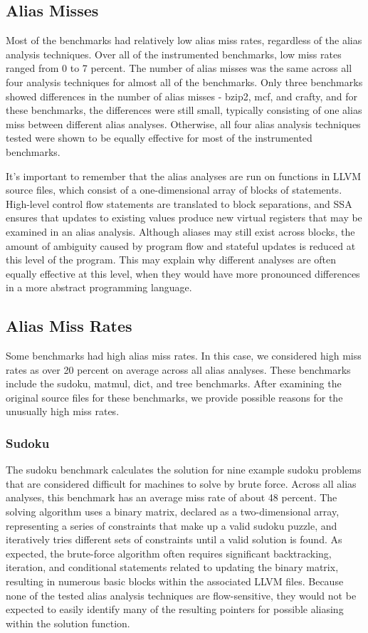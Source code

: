 \subsection{Alias Misses}
Most of the benchmarks had relatively low alias miss rates, regardless of the alias analysis techniques. Over all of the instrumented benchmarks, low miss rates ranged from 0 to 7 percent. The number of alias misses was the same across all four analysis techniques for almost all of the benchmarks. Only three benchmarks showed differences in the number of alias misses - bzip2, mcf, and crafty, and for these benchmarks, the differences were still small, typically consisting of one alias miss between different alias analyses. Otherwise, all four alias analysis techniques tested were shown to be equally effective for most of the instrumented benchmarks.

It's important to remember that the alias analyses are run on functions in LLVM source files, which consist of a one-dimensional array of blocks of statements. High-level control flow statements are translated to block separations, and SSA ensures that updates to existing values produce new virtual registers that may be examined in an alias analysis. Although aliases may still exist across blocks, the amount of ambiguity caused by program flow and stateful updates is reduced at this level of the program. This may explain why different analyses are often equally effective at this level, when they would have more pronounced differences in a more abstract programming language.

\subsection{Alias Miss Rates}
Some benchmarks had high alias miss rates. In this case, we considered high miss rates as over 20 percent on average across all alias analyses. These benchmarks include the sudoku, matmul, dict, and tree benchmarks. After examining the original source files for these benchmarks, we provide possible reasons for the unusually high miss rates.

\subsubsection{Sudoku}
The sudoku benchmark calculates the solution for nine example sudoku problems that are considered difficult for machines to solve by brute force. Across all alias analyses, this benchmark has an average miss rate of about 48 percent. The solving algorithm uses a binary matrix, declared as a two-dimensional array, representing a series of constraints that make up a valid sudoku puzzle, and iteratively tries different sets of constraints until a valid solution is found. As expected, the brute-force algorithm often requires significant backtracking, iteration, and conditional statements related to updating the binary matrix, resulting in numerous basic blocks within the associated LLVM files. Because none of the tested alias analysis techniques are flow-sensitive, they would not be expected to easily identify many of the resulting pointers for possible aliasing within the solution function.

